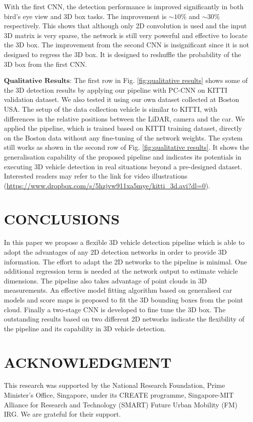 \documentclass[letterpaper, 10 pt, conference]{ieeeconf}  \usepackage[
\begin{document}
With the first CNN, the detection performance is improved significantly in both bird's eye view and 3D box tasks. The improvement is $\sim 10\%$ and $\sim 30\%$ respectively. This shows that although only 2D convolution is used and the input 3D matrix is very sparse, the network is still very powerful and effective to locate the 3D box. The improvement from the second CNN is insignificant since it is not designed to regress the 3D box. It is designed to reshuffle the probability of the 3D box from the first CNN.








$\textbf{Qualitative Results:}$ The first row in Fig. \ref{fig:qualitative results} shows some of the 3D detection results by applying our pipeline with PC-CNN on KITTI validation dataset. We also tested it using our own dataset collected at Boston USA. The setup of the data collection vehicle is similar to KITTI,  with differences in the relative positions between the LiDAR, camera and the car. We applied the pipeline, which is trained based on KITTI training dataset, directly on the Boston data without any fine-tuning of the network weights. The system still works as shown in the second row of Fig. \ref{fig:qualitative results}. It shows the generalisation capability of the proposed pipeline and indicates its potentials in executing 3D vehicle detection in real situations beyond a pre-designed dataset. Interested readers may refer to the link for video illustrations (\url{https://www.dropbox.com/s/5hzjvw911xa5mye/kitti_3d.avi?dl=0}).


\section{CONCLUSIONS}
\label{sec:conclusions}

In this paper we propose a flexible 3D vehicle detection pipeline which is able to adopt the advantages of any 2D detection networks in order to provide 3D information. The effort to adapt the 2D networks to the pipeline is minimal. One additional regression term is needed at the network output to estimate vehicle dimensions. The pipeline also takes advantage of point clouds in 3D measurements. An effective model fitting algorithm based on generalised car models and score maps is proposed to fit the 3D bounding boxes from the point cloud. Finally a two-stage CNN is developed to fine tune the 3D box. The outstanding results based on two different 2D networks indicate the flexibility of the pipeline and its capability in 3D vehicle detection.

\section*{ACKNOWLEDGMENT}
This research was supported by the National Research Foundation, Prime Minister's Office, Singapore, under its CREATE programme, Singapore-MIT Alliance for Research and Technology (SMART) Future Urban Mobility (FM) IRG. We are grateful for their support.

	

\end{document}
